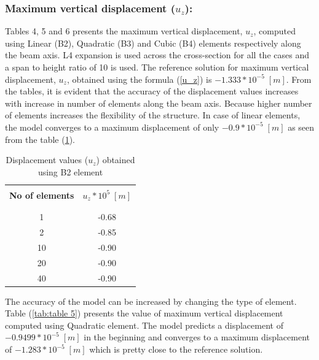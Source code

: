 \documentclass[a4paper,12pt]{article}
\begin{document}
\subsubsection*{Maximum vertical displacement ($u_{z}$):}
Tables 4, 5 and 6 presents the maximum vertical displacement, $u_{z}$, computed using Linear (B2), Quadratic (B3) and Cubic (B4) elements respectively along the beam axis. L4 expansion is used across the cross-section for all the cases and a span to height ratio of 10 is used. The reference solution for maximum vertical displacement, $u_{z}$, obtained using the formula (\ref{u_z}) is $-1.333*10^{-5}\;[m]$. From the tables, it is evident that the accuracy of the displacement values increases with increase in number of elements along the beam axis. Because higher number of elements increases the flexibility of the structure. In case of linear elements, the model converges to a maximum displacement of only $-0.9*10^{-5}\;[m]$ as seen from the table (\ref{tab:table 4}).
\begin{table}[h!]
  \begin{center}
     \begin{tabular}{c c}
      \hline\\
      \textbf{No of elements} & \textbf{$u_{z}*10^{5}\;[m]$} \\
      \\
      \hline
      \\[-2pt]
       1 & -0.68 \\[5pt]
       2 & -0.85 \\[5pt]
      10 & -0.90 \\[5pt]
      20 & -0.90 \\[5pt]
      40 & -0.90 \\[5pt]

      \hline
     \end{tabular}
    \caption{Displacement values ($u_{z}$) obtained using B2 element}
    \label{tab:table 4}
  \end{center}
\end{table}
\newpage
The accuracy of the model can be increased by changing the type of element. Table (\ref{tab:table 5}) presents the value of maximum vertical displacement computed using Quadratic element. The model predicts a displacement of $-0.9499*10^{-5}\;[m]$ in the beginning and converges to a maximum displacement of $-1.283*10^{-5}\;[m]$ which is pretty close to the reference solution.
\end{document}
